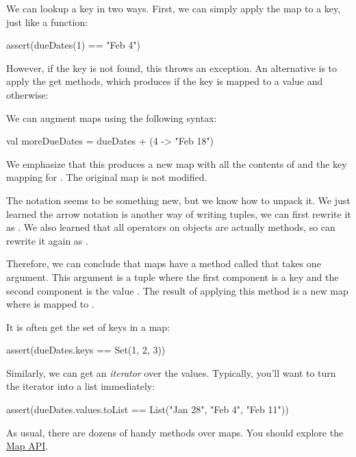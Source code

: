 \documentclass{book}
\begin{document}
We can lookup a key in two ways. First, we can simply apply the map to a key,
just like a function:
\begin{scalacode}
assert(dueDates(1) == "Feb 4")
\end{scalacode}

However, if the key is not found, this throws an exception. An alternative
is to apply the get methods, which produces  if the
key is mapped to a value and  otherwise:
%
\begin{scalacode}
dueDates.get(x) match {
  case Some(v) => v
  case None => "Unknown assignment"
\end{scalacode}

We can augment maps using the following syntax:
\begin{scalacode}
val moreDueDates = dueDates + (4 -> "Feb 18")
\end{scalacode}
We emphasize that this produces a new map with all the contents of
 and the key mapping for .
The original map is not modified.

\begin{notation}
The notation  seems to be something
new, but we know how to unpack it. We just learned the arrow notation is
another way of writing tuples, we can first rewrite it as .
We also learned that all operators on objects are actually methods, so
can rewrite it again as .

Therefore, we can conclude that maps have a method called \scalainline{+} that
takes one argument. This argument is a tuple where the first component is a key
 and the second component is the value . The
result of applying this method is a new map where  is mapped to
.
\end{notation}

It is often get the set of keys in a map:
\begin{scalacode}
assert(dueDates.keys == Set(1, 2, 3))
\end{scalacode}

Similarly, we can get an \emph{iterator} over the values. Typically, you'll
want to turn the iterator into a list immediately:
\begin{scalacode}
assert(dueDates.values.toList == List("Jan 28", "Feb 4", "Feb 11"))
\end{scalacode}

As usual, there are dozens of handy methods over maps. You should
explore the \href{http://www.scala-lang.org/api/2.11.7/index.html#scala.collection.Map}{Map API}.
\end{document}
